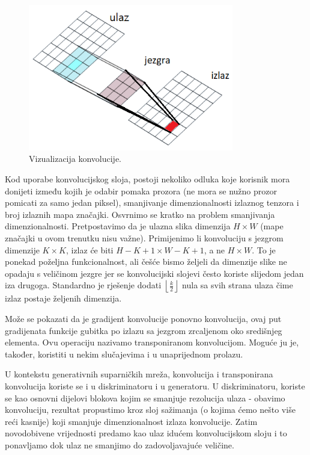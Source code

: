 \begin{figure}[h]
\centering
		\includegraphics[width=0.8\textwidth]{images/conv.png}
\caption{Vizualizacija konvolucije.}
\label{conv}
\end{figure}

Kod uporabe konvolucijskog sloja, postoji nekoliko odluka koje korisnik mora donijeti između kojih je odabir pomaka prozora (ne mora se nužno prozor pomicati za samo jedan piksel), smanjivanje dimenzionalnosti izlaznog tenzora i broj izlaznih mapa značajki. Osvrnimo se kratko na problem smanjivanja dimenzionalnosti. Pretpostavimo da je ulazna slika dimenzija $H \times W$ (mape značajki u ovom trenutku nisu važne). Primijenimo li konvoluciju s jezgrom dimenzije $K \times K$, izlaz će biti $H - K +  1 \times W - K + 1$, a ne $H \times W$. To je ponekad poželjna funkcionalnost, ali češće bismo željeli da dimenzije slike ne opadaju s veličinom jezgre jer se konvolucijski slojevi često koriste slijedom jedan iza drugoga. Standardno je rješenje dodati $\left \lfloor \frac{k}{2} \right \rfloor$ nula sa svih strana ulaza čime izlaz postaje željenih dimenzija.

Može se pokazati da je gradijent konvolucije ponovno konvolucija, ovaj put gradijenata funkcije gubitka po izlazu sa jezgrom zrcaljenom oko središnjeg elementa. Ovu operaciju nazivamo transponiranom konvolucijom. Moguće ju je, također, koristiti u nekim slučajevima i u unaprijednom prolazu.

U kontekstu generativnih suparničkih mreža, konvolucija i transponirana konvolucija koriste se i u diskriminatoru i u generatoru. U diskriminatoru, koriste se kao osnovni dijelovi blokova kojim se smanjuje rezolucija ulaza - obavimo konvoluciju, rezultat propustimo kroz sloj sažimanja (o kojima ćemo nešto više reći kasnije) koji smanjuje dimenzionalnost izlaza konvolucije. Zatim novodobivene vrijednosti predamo kao ulaz idućem konvolucijskom sloju i to ponavljamo dok ulaz ne smanjimo do zadovoljavajuće veličine. 

